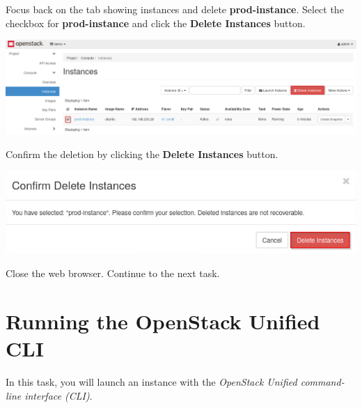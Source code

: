 \documentclass[letterpaper, 12pt]{article}
\begin{document}
\begin{enumerate}
    \begin{labstep}
        Focus back on the tab showing instances and delete \textbf{prod-instance}.
        Select the checkbox for \textbf{prod-instance} and click the \textbf{Delete Instances} button.

        \begin{center}
            \includegraphics[width=\linewidth]{images/part1/step16.png}
        \end{center}
    \end{labstep}

    \begin{labstep}
        Confirm the deletion by clicking the \textbf{Delete Instances} button.

        \begin{center}
            \includegraphics[width=\linewidth]{images/part1/step17.png}
        \end{center}
    \end{labstep}

    \begin{labstep}
        Close the web browser.
        Continue to the next task.
    \end{labstep}
\end{enumerate}

\section{Running the OpenStack Unified CLI}\label{sec:running-the-openstack-unified-cli}
In this task, you will launch an instance with the \textit{OpenStack Unified command-line interface (CLI)}.
\end{document}
